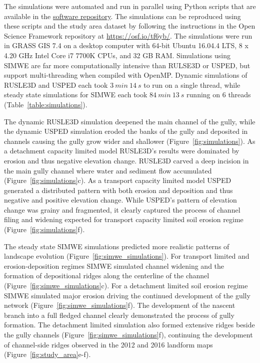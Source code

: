 \documentclass[esurf, manuscript]{copernicus}
\begin{document}
The simulations were automated and run in parallel
using Python scripts that are available in the 
\href{https://github.com/baharmon/landscape_evolution}{software repository}.
The simulations can be reproduced using these scripts
and the study area dataset 
by following the instructions 
in the Open Science Framework repository 
at \url{https://osf.io/tf6yb/}.
The simulations were run 
in GRASS GIS 7.4 
on a desktop computer 
with 64-bit Ubuntu 16.04.4 LTS,
8 x 4.20 GHz Intel Core i7 7700K CPUs,
and 32 GB RAM. 
Simulations using SIMWE 
are far more computationally intensive
than RULSE3D or USPED, 
but support multi-threading 
when compiled with OpenMP. 
Dynamic simulations of RUSLE3D and USPED each took
$3~min~14~s$ to run on a single thread, 
while steady state simulations for SIMWE each took 
$84~min~13~s$ running on 6 threads
(Table~\ref{table:simulations}).



The dynamic RUSLE3D simulation
deepened the main channel of the gully,
while the dynamic USPED simulation
eroded the banks of the gully
and deposited in channels
causing the gully grow wider and shallower
(Figure~\ref{fig:simulations}). 
%
As a detachment capacity limited model
RUSLE3D's results were
dominated by erosion and 
thus negative elevation change.
%
RUSLE3D carved a deep incision 
in the main gully channel
where water and sediment flow accumulated
(Figure~\ref{fig:simulations}c). 
%
As a transport capacity limited model
USPED generated a distributed pattern
with both erosion and deposition and thus
negative and positive elevation change. 
%
While USPED's pattern of elevation change
was grainy and fragmented, 
it clearly captured the process of channel 
filing and widening expected for 
transport capacity limited soil erosion regime
(Figure~\ref{fig:simulations}f). 

The steady state SIMWE simulations 
predicted more realistic patterns 
of landscape evolution
(Figure~\ref{fig:simwe_simulations}). 
%
For transport limited and
erosion-deposition regimes
SIMWE simulated
channel widening 
and the formation of depositional ridges
along the centerline of the channel
(Figure~\ref{fig:simwe_simulations}c).
%
For a detachment limited soil erosion regime
SIMWE simulated major erosion
driving the continued development 
of the gully network
(Figure~\ref{fig:simwe_simulations}f). 
%
The development of the nascent branch
into a full fledged channel
clearly demonstrated the process 
of gully formation. 
%
The detachment limited simulation
also formed extensive ridges
beside the gully channels 
(Figure~\ref{fig:simwe_simulations}f), 
continuing the development of 
channel-side ridges
observed in the 2012 and 2016 landform maps
(Figure~\ref{fig:study_area}e-f). 
\end{document}
